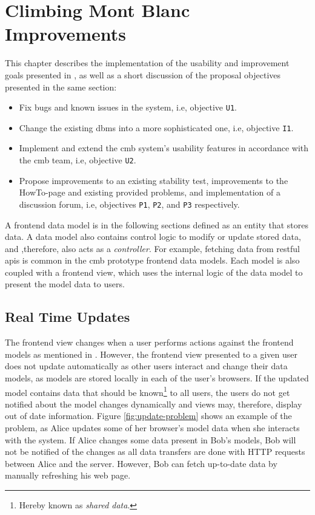 \chapter{Climbing Mont Blanc Improvements}
\label{ch:improvements}
This chapter describes the implementation of the usability and improvement goals presented in , as well as a short discussion of the proposal objectives presented in the same section:
\begin{itemize}
    \item Fix bugs and known issues in the system, i.e, objective \texttt{U1}.
    \item Change the existing \gls{dbms} into a more sophisticated one, i.e, objective \texttt{I1}.
    \item Implement and extend the \gls{cmb} system's usability features in accordance with the \gls{cmb} team, i.e, objective \texttt{U2}.
    \item Propose improvements to an existing stability test, improvements to the HowTo-page and existing provided problems, and implementation of a discussion forum, i.e, objectives \texttt{P1}, \texttt{P2}, and \texttt{P3} respectively.
\end{itemize}
A frontend data model is in the following sections defined as an entity that stores data. A data model also contains control logic to modify or update stored data, and ,therefore, also acts as a \textit{controller}. For example, fetching data from \gls{rest}ful \glspl{api} is common in the \gls{cmb} prototype frontend data models. Each model is also coupled with a frontend view, which uses the internal logic of the data model to present the model data to users.
\clearpage
\section{Real Time Updates}
\label{sec:real-time}
The frontend view changes when a user performs actions against the frontend models as mentioned in . However, the frontend view presented to a given user does not update automatically as other users interact and change their data models, as models are stored locally in each of the user's browsers. If the updated model contains data that should be known\footnote{Hereby known as \textit{shared data}.} to all users, the users do not get notified about the model changes dynamically and views may, therefore, display out of date information. Figure \ref{fig:update-problem} shows an example of the problem, as Alice updates some of her browser’s model data when she interacts with the system. If Alice changes some data present in Bob’s models, Bob will not be notified of the changes as all data transfers are done with HTTP requests between Alice and the server. However, Bob can fetch up-to-date data by manually refreshing his web page. \\

